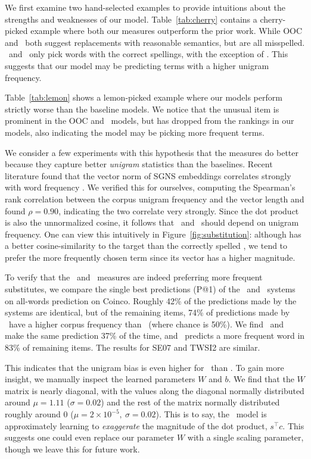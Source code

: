 We first examine two hand-selected examples to provide intuitions about the
strengths and weaknesses of our model.  Table~\ref{tab:cherry} contains a
cherry-picked example where both our measures outperform the prior work.
While OOC and \balAddCos~both suggest replacements with reasonable semantics,
but are all misspelled.  \ourmeas~and \ourmeasparam~only pick words with the
correct spellings, with the exception of . This suggests that our
model may be predicting terms with a higher unigram frequency.

Table~\ref{tab:lemon} shows a lemon-picked example where our models perform
strictly worse than the baseline models.  We notice that the unusual
 item is prominent in the OOC and \balAddCos~models, but has
dropped from the rankings in our models, also indicating the model may be
picking more frequent terms.

We consider a few experiments with this hypothesis that the measures do better
because they capture better {\em unigram} statistics than the baselines. Recent
literature found that the vector norm of SGNS embeddings correlates strongly
with word frequency \cite{wilson:2015:arxiv}. We verified this for ourselves,
computing the Spearman's rank correlation between the corpus unigram frequency
and the vector length and found $\rho = 0.90$, indicating the two correlate
very strongly. Since the dot product is also the unnormalized cosine, it
follows that \ourmeas~and \ourmeasparam~should depend on unigram frequency.
One can view this intuitively in Figure~\ref{fig:substitution}: although
 has a better cosine-similarity to the target than the correctly
spelled , we tend to prefer the more frequently chosen term
since its vector has a higher magnitude.

To verify that the \ourmeas~and \ourmeasparam~measures are indeed preferring
more frequent substitutes, we compare the single best predictions (P@1) of the
\balAddCos~and \ourmeas~systems on all-words prediction on Coinco. Roughly 42\%
of the predictions made by the systems are identical, but of the remaining
items, 74\% of predictions made by \ourmeas~have a higher corpus frequency than
\balAddCos~(where chance is 50\%). We find \balAddCos~and \ourmeasparam~ make
the same prediction 37\% of the time, and \ourmeasparam~predicts a more
frequent word in 83\% of remaining items. The results for SE07 and TWSI2 are
similar.

This indicates that the unigram bias is even higher for \ourmeasparam~than
\ourmeas. To gain more insight, we manually inspect the learned parameters $W$
and $b$. We find that the $W$ matrix is nearly diagonal, with the values along
the diagonal normally distributed around $\mu=1.11$ ($\sigma=0.02$) and the
rest of the matrix normally distributed roughly around 0
($\mu=2\times10^{-5},~\sigma=0.02$). This is to say, the \ourmeasparam~model is
approximately learning to {\em exaggerate} the magnitude of the dot product,
$s^\top c$. This suggests one could even replace our parameter $W$ with a
single scaling parameter, though we leave this for future work.

